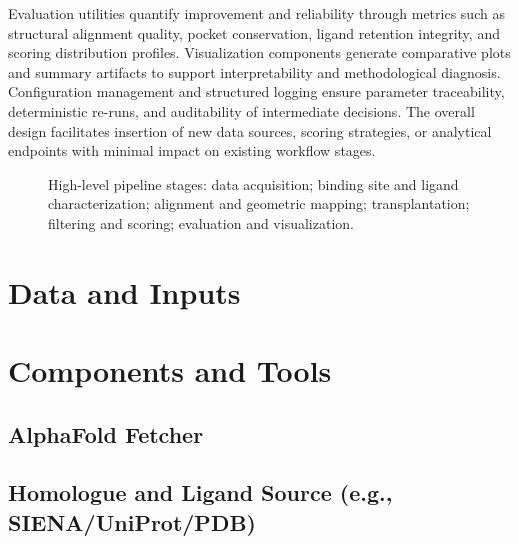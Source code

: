 Evaluation utilities quantify improvement and reliability through metrics such as structural alignment quality, pocket conservation, ligand retention integrity, and scoring distribution profiles. Visualization components generate comparative plots and summary artifacts to support interpretability and methodological diagnosis. Configuration management and structured logging ensure parameter traceability, deterministic re-runs, and auditability of intermediate decisions. The overall design facilitates insertion of new data sources, scoring strategies, or analytical endpoints with minimal impact on existing workflow stages.

\begin{figure}[H]
    \centering
    \caption{High-level pipeline stages: data acquisition; binding site and ligand characterization; alignment and geometric mapping; transplantation; filtering and scoring; evaluation and visualization.}
    \label{fig:pipeline_overview}
\end{figure}


\section{Data and Inputs}

\section{Components and Tools}
\subsection{AlphaFold Fetcher}
\subsection{Homologue and Ligand Source (e.g., SIENA/UniProt/PDB)}
